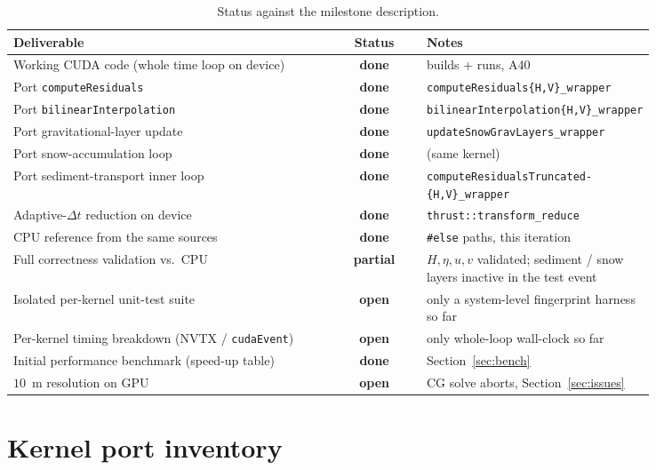 \documentclass[11pt,a4paper]{article}
\newcommand{\stdone}{{\color{green!55!black}\textbf{done}}}
\newcommand{\stpart}{{\color{orange!80!black}\textbf{partial}}}
\newcommand{\stopen}{{\color{red!70!black}\textbf{open}}}
\begin{document}
\begin{table}[h]
\centering
\small
\begin{tabular}{@{}p{0.50\linewidth}c p{0.34\linewidth}@{}}
\toprule
Deliverable & Status & Notes \\
\midrule
Working CUDA code (whole time loop on device)        & \stdone  & builds + runs, A40 \\
Port \texttt{computeResiduals}                        & \stdone  & \texttt{computeResiduals\{H,V\}\_wrapper} \\
Port \texttt{bilinearInterpolation}                   & \stdone  & \texttt{bilinearInterpolation\{H,V\}\_wrapper} \\
Port gravitational-layer update                       & \stdone  & \texttt{updateSnowGravLayers\_wrapper} \\
Port snow-accumulation loop                           & \stdone  & (same kernel) \\
Port sediment-transport inner loop                    & \stdone  & \texttt{computeResidualsTruncated-} \texttt{\{H,V\}\_wrapper} \\
Adaptive-$\Delta t$ reduction on device              & \stdone  & \texttt{thrust::transform\_reduce} \\
CPU reference from the same sources                   & \stdone  & \texttt{\#else} paths, this iteration \\
Full correctness validation vs.\ CPU                  & \stpart  & $H,\eta,u,v$ validated; sediment / snow layers inactive in the test event \\
Isolated per-kernel unit-test suite                  & \stopen  & only a system-level fingerprint harness so far \\
Per-kernel timing breakdown (NVTX / \texttt{cudaEvent}) & \stopen & only whole-loop wall-clock so far \\
Initial performance benchmark (speed-up table)        & \stdone  & Section~\ref{sec:bench} \\
$10$~m resolution on GPU                              & \stopen  & CG solve aborts, Section~\ref{sec:issues} \\
\bottomrule
\end{tabular}
\caption{Status against the milestone description.}
\end{table}

\section{Kernel port inventory}
\end{document}
